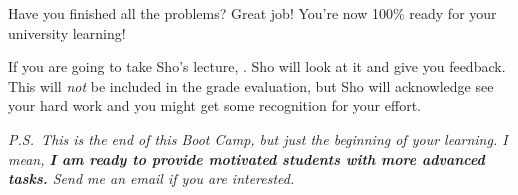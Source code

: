 \documentclass[11pt,pdfa,lastpage]{MishoNote}
\begin{document}
Have you finished all the problems? Great job! You're now 100\% ready for your university learning!

If you are going to take Sho's lecture, .
Sho will look at it and give you feedback. This will \emph{not} be included in the grade evaluation, but Sho will acknowledge see your hard work and you might get some recognition for your effort.


\vfill

\noindent
\emph{P.S.~This is the end of this Boot Camp, but just the beginning of your learning. I mean, \textbf{I am ready to provide motivated students with more advanced tasks.} Send me an email if you are interested.}
\end{document}
